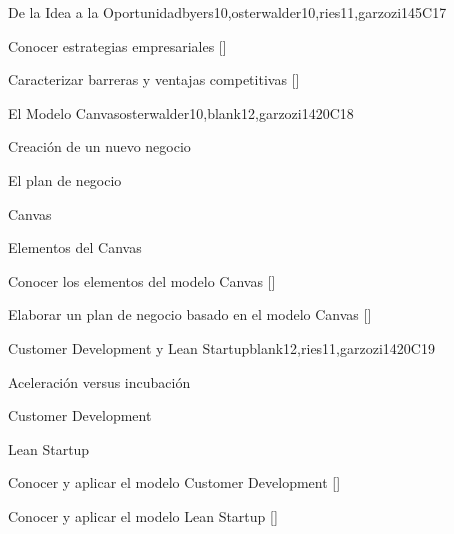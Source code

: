 \begin{syllabus}
\begin{unit}{}{De la Idea a la Oportunidad}{byers10,osterwalder10,ries11,garzozi14}{5}{C17}
     \begin{learningoutcomes} 
         \item Conocer estrategias empresariales  [\Familiarity]
         \item Caracterizar barreras y ventajas competitivas   [\Familiarity]
          
       \end{learningoutcomes} 
   \end{unit}
   
   \begin{unit}{}{El Modelo Canvas}{osterwalder10,blank12,garzozi14}{20}{C18}
      \begin{topics}
         \item Creación de un nuevo negocio
         \item El plan de negocio 
         \item Canvas
         \item Elementos del Canvas
      \end{topics}
   
     \begin{learningoutcomes} 
         \item Conocer los elementos del modelo Canvas  [\Usage]
         \item Elaborar un plan de negocio basado en el modelo Canvas  [\Usage]
       \end{learningoutcomes} 
   \end{unit}
   
   \begin{unit}{}{Customer Development y Lean Startup}{blank12,ries11,garzozi14}{20}{C19}
      \begin{topics}
         \item Aceleración versus incubación  
         \item Customer Development
         \item Lean Startup 
      \end{topics}
   
      \begin{learningoutcomes} 
         \item Conocer y aplicar el modelo Customer Development  [\Usage]
         \item Conocer y aplicar el modelo Lean Startup  [\Usage]
       \end{learningoutcomes} 
   \end{unit}
   

\end{syllabus}
